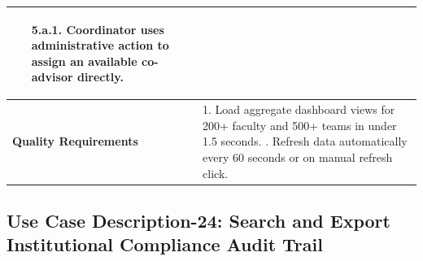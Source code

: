 \begin{table}[H]
\begin{tabularx}{\textwidth}{|l|X|}
\begin{itemize}[leftmargin=*]
    \begin{itemize}[leftmargin=*]
        \item[5.a.1.] Coordinator uses administrative action to assign an available co-advisor directly.
    \end{itemize}
\end{itemize} \\ \hline
\textbf{Quality Requirements} & 
1. Load aggregate dashboard views for 200+ faculty and 500+ teams in under 1.5 seconds. \newline
2. Refresh data automatically every 60 seconds or on manual refresh click. \\ \hline
\end{tabularx}
\end{table}

\clearpage
\subsection{Use Case Description-24: Search and Export Institutional Compliance Audit Trail}
\label{subsec:uc24}

